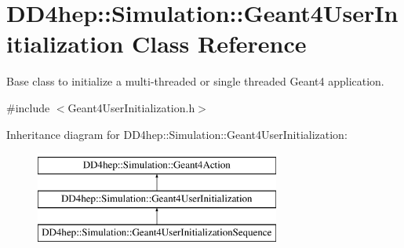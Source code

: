\hypertarget{class_d_d4hep_1_1_simulation_1_1_geant4_user_initialization}{}\section{D\+D4hep\+:\+:Simulation\+:\+:Geant4\+User\+Initialization Class Reference}
\label{class_d_d4hep_1_1_simulation_1_1_geant4_user_initialization}


Base class to initialize a multi-\/threaded or single threaded Geant4 application.  




{\ttfamily \#include $<$Geant4\+User\+Initialization.\+h$>$}

Inheritance diagram for D\+D4hep\+:\+:Simulation\+:\+:Geant4\+User\+Initialization\+:\begin{figure}[H]
\begin{center}
\leavevmode
\includegraphics[height=3.000000cm]{class_d_d4hep_1_1_simulation_1_1_geant4_user_initialization}
\end{center}
\end{figure}

